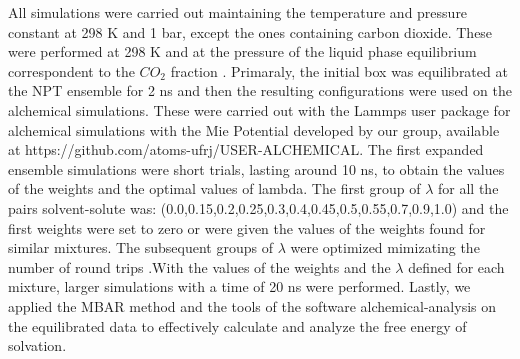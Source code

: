 All simulations were carried out maintaining the temperature and pressure constant at 298 K and 1 bar, except the ones containing carbon dioxide. These were performed at 298 K and at the pressure of the liquid phase equilibrium correspondent to the $CO_{2}$ fraction \cite{co2toliq}. Primaraly, the initial box was equilibrated at the NPT ensemble for 2 ns and then the resulting configurations were used on the alchemical simulations. These were carried out with the Lammps user package for alchemical simulations with the Mie Potential developed by our group, available at https://github.com/atoms-ufrj/USER-ALCHEMICAL. The first expanded ensemble simulations were short trials, lasting around 10 ns, to obtain the values of the weights and the optimal values of lambda. The first group of $\lambda$ for all the pairs solvent-solute was: (0.0,0.15,0.2,0.25,0.3,0.4,0.45,0.5,0.55,0.7,0.9,1.0) and the first weights were set to zero or were given the values of the weights found for similar mixtures. The subsequent groups of $\lambda$ were optimized mimizating the number of round trips .With the values of the weights and the $\lambda $ defined for each mixture, larger simulations with a time of 20 ns were performed. Lastly, we applied the MBAR method and the tools of the software alchemical-analysis \cite{klimovich} on the equilibrated data to effectively calculate and analyze the free energy of solvation.


